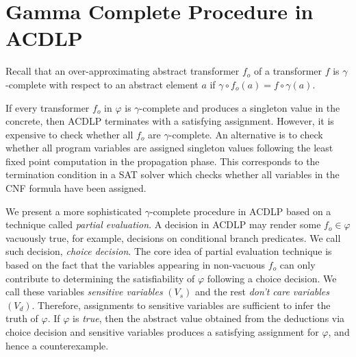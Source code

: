 \section{Gamma Complete Procedure in ACDLP}

Recall that an over-approximating abstract transformer 
$f_{o}$ of a transformer $f$ is $\gamma$-complete with 
respect to an abstract element $a$ if $\gamma \circ f_{o}(a) = f \circ \gamma(a)$.  

If every transformer $f_{o}$ in $\varphi$ is $\gamma$-complete and 
produces a singleton value in the concrete, then ACDLP terminates 
with a satisfying assignment.  However, it is expensive to check whether all
$f_o$ are $\gamma$-complete.  An alternative is to check whether 
all program variables are assigned singleton values following the least fixed 
point computation in the propagation phase.  This corresponds to the 
termination condition in a SAT solver which checks whether all variables 
in the CNF formula have been assigned.

We present a more sophisticated $\gamma$-complete procedure in ACDLP based 
on a technique called {\em partial evaluation}.  A decision in ACDLP 
may render some $f_o \in \varphi$ vacuously true, for example, decisions on 
conditional branch predicates.  We call such decision, {\em choice decision}.
The core idea of partial evaluation technique is based on the fact 
that the variables appearing in non-vacuous $f_o$ can only contribute to 
determining the satisfiability of $\varphi$ following a choice decision. 
We call these variables {\em sensitive variables} $(V_s)$ and the rest 
{\em don't care variables} $(V_d)$.  Therefore, assignments to sensitive 
variables are sufficient to infer the truth of $\varphi$.  If $\varphi$ is 
{\em true}, then the abstract value obtained from the deductions via choice 
decision and sensitive variables produces a satisfying assignment for $\varphi$, 
and hence a counterexample. 


